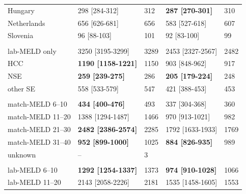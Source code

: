 \documentclass[11pt,twoside,]{book}
\begin{document}
\begin{table}[b]
{\begin{tabular}{L{3.4cm} R{3.9cm} L{.9cm} R{3.9cm} L{.9cm}}
\hspace{.7em}Hungary & 298    [284-312] & 312 & \textbf{287    [270-301]} & 310\\
\hspace{.7em}Netherlands & 656    [626-681] & 656 & 583    [527-618] & 607\\
\hspace{.7em}Slovenia & 96     [88-103] & 101 & 92     [83-100] & 99\\
\addlinespace[0.3em]
\\
\hspace{.7em}lab-MELD only & 3250   [3195-3299] & 3289 & 2453   [2327-2567] & 2482\\
\hspace{.7em}HCC & \textbf{1190   [1158-1221]} & 1150 & 903    [848-962] & 917\\
\hspace{.7em}NSE & \textbf{259    [239-275]} & 286 & \textbf{205    [179-224]} & 248\\
\hspace{.7em}other SE & 558    [533-579] & 547 & 421    [388-453] & 453\\
\addlinespace[0.3em]
\\
\hspace{.7em}match-MELD 6--10 & \textbf{434    [400-476]} & 493 & 337    [304-368] & 360\\
\hspace{.7em}match-MELD 11--20 & 1388   [1294-1487] & 1466 & 970    [913-1021] & 982\\
\hspace{.7em}match-MELD 21--30 & \textbf{2482   [2386-2574]} & 2285 & 1792   [1633-1933] & 1769\\
\hspace{.7em}match-MELD 31--40 & \textbf{952    [899-1000]} & 1025 & \textbf{884    [826-935]} & 989\\
\hspace{.7em}unknown & -- & 3 &  & \\
\addlinespace[0.3em]
\\
\hspace{.7em}lab-MELD 6--10 & \textbf{1292   [1254-1337]} & 1373 & \textbf{974    [910-1028]} & 1066\\
\hspace{.7em}lab-MELD 11--20 & 2143   [2058-2226] & 2181 & 1535   [1458-1605] & 1553\\

\end{tabular}}
\end{table}
\end{document}
